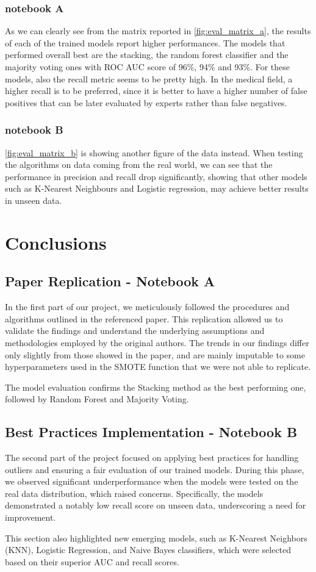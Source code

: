 \documentclass[twocolumn, 9pt]{extarticle}
\begin{document}
\subsubsection{notebook A}
As we can clearly see from the matrix reported in \ref{fig:eval_matrix_a}, the results of each of the trained models report higher performances. The models that performed overall best are the stacking, the random forest classifier and the majority voting ones with ROC AUC score of 96\%, 94\% and 93\%. For these models, also the recall metric seems to be pretty high. In the medical field, a higher recall is to be preferred, since it is better to have a higher number of false positives that can be later evaluated by experts rather than false negatives. 

\subsubsection{notebook B}
\ref{fig:eval_matrix_b} is showing another figure of the data instead. When testing the algorithms on data coming from the real world, we can see that the performance in precision and recall drop significantly, showing that other models such as K-Nearest Neighbours and Logistic regression, may achieve better results in unseen data.
 
\section{Conclusions}
\subsection{Paper Replication - Notebook A}
In the first part of our project, we meticulously followed the procedures and algorithms outlined in the referenced paper. This replication allowed us to validate the findings and understand the underlying assumptions and methodologies employed by the original authors. The trends in our findings differ only slightly from those showed in the paper, and are mainly imputable to some hyperparameters used in the SMOTE function that we were not able to replicate.

The model evaluation confirms the Stacking method as the best performing one, followed by Random Forest and Majority Voting.

\subsection{Best Practices Implementation - Notebook B}
The second part of the project focused on applying best practices for handling outliers and ensuring a fair evaluation of our trained models. During this phase, we observed significant underperformance when the models were tested on the real data distribution, which raised concerns. Specifically, the models demonstrated a notably low recall score on unseen data, underscoring a need for improvement.

This section also highlighted new emerging models, such as K-Nearest Neighbors (KNN), Logistic Regression, and Naive Bayes classifiers, which were selected based on their superior AUC and recall scores.




\end{document}
